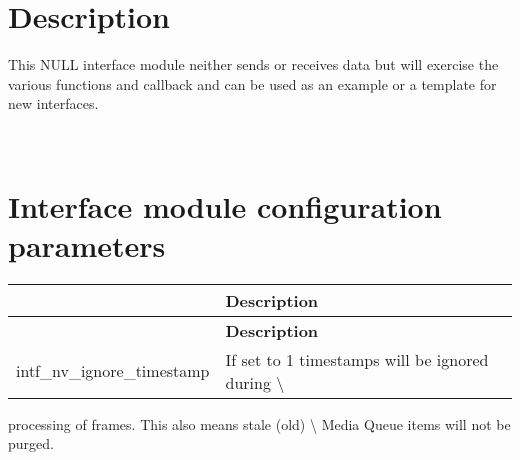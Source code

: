 \section*{Description}

This N\+U\+LL interface module neither sends or receives data but will exercise the various functions and callback and can be used as an example or a template for new interfaces.

~\newline
 \section*{Interface module configuration parameters}

\tabulinesep=1mm
\begin{longtabu} spread 0pt [c]{*2{|X[-1]}|}
\hline
{}&{\bf Description  }\\
\endfirsthead
\hline
\endfoot
\hline
{}&{\bf Description  }\\
\endhead
intf\+\_\+nv\+\_\+ignore\+\_\+timestamp &If set to 1 timestamps will be ignored during \textbackslash{} \\
\end{longtabu}
processing of frames. This also means stale (old) \textbackslash{} Media Queue items will not be purged. 